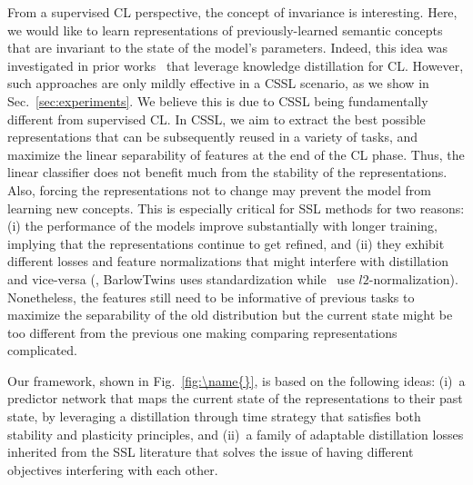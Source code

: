 From a supervised CL perspective, the concept of invariance is interesting. Here, we would like to learn representations of previously-learned semantic concepts that are invariant to the state of the model's parameters. 
Indeed, this idea was investigated in prior works~\cite{douillard2020podnet, hou2019learning} that leverage knowledge distillation for CL. However, such approaches are only  mildly effective in a CSSL scenario, as we show in Sec.~\ref{sec:experiments}. 
We believe this is due to CSSL being fundamentally different from supervised CL. In CSSL, we aim to extract the best possible representations that can be subsequently reused in a variety of tasks, and maximize the linear separability of features at the end of the CL phase. Thus, the linear classifier does not benefit much from the stability of the representations. Also, forcing the representations not to change may prevent the model from learning new concepts. 
This is especially critical for SSL methods for two reasons: (i) the performance of the models improve substantially with longer training, implying that the representations continue to get refined, and (ii) they exhibit different losses and feature normalizations that might interfere with distillation and vice-versa (\eg, BarlowTwins uses standardization while~\cite{douillard2020podnet, hou2019learning} use $l2$-normalization). Nonetheless, the features still need to be informative of previous tasks to maximize the separability of the old distribution but the current state might be too different from the previous one making comparing representations complicated.

\vspace{2pt}
Our framework, shown in Fig.~\ref{fig:\name{}}, is based on the following ideas: (i)~a predictor network that maps the current state of the representations to their past state, by leveraging a distillation through time strategy that satisfies both stability and plasticity principles, and (ii)~a family of adaptable distillation losses inherited from the SSL literature that solves the issue of having different objectives interfering with each other.

